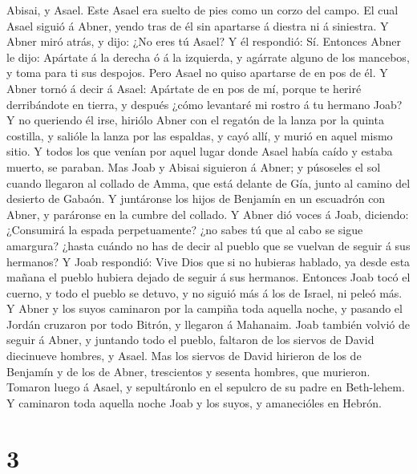 Abisai, y Asael. Este Asael era suelto de pies como un corzo del campo.
 El cual Asael siguió á Abner, yendo tras de él sin
apartarse á diestra ni á siniestra.  Y Abner miró atrás, y
dijo: ¿No eres tú Asael? Y él respondió: Sí.  Entonces
Abner le dijo: Apártate á la derecha ó á la izquierda, y agárrate alguno
de los mancebos, y toma para ti sus despojos. Pero Asael no quiso
apartarse de en pos de él.  Y Abner tornó á decir á Asael:
Apártate de en pos de mí, porque te heriré derribándote en tierra, y
después ¿cómo levantaré mi rostro á tu hermano Joab?  Y no
queriendo él irse, hiriólo Abner con el regatón de la lanza por la
quinta costilla, y salióle la lanza por las espaldas, y cayó allí, y
murió en aquel mismo sitio. Y todos los que venían por aquel lugar donde
Asael había caído y estaba muerto, se paraban.  Mas Joab y
Abisai siguieron á Abner; y púsoseles el sol cuando llegaron al collado
de Amma, que está delante de Gía, junto al camino del desierto de
Gabaón.  Y juntáronse los hijos de Benjamín en un escuadrón
con Abner, y paráronse en la cumbre del collado.  Y Abner
dió voces á Joab, diciendo: ¿Consumirá la espada perpetuamente? ¿no
sabes tú que al cabo se sigue amargura? ¿hasta cuándo no has de decir al
pueblo que se vuelvan de seguir á sus hermanos?  Y Joab
respondió: Vive Dios que si no hubieras hablado, ya desde esta mañana el
pueblo hubiera dejado de seguir á sus hermanos.  Entonces
Joab tocó el cuerno, y todo el pueblo se detuvo, y no siguió más á los
de Israel, ni peleó más.  Y Abner y los suyos caminaron por
la campiña toda aquella noche, y pasando el Jordán cruzaron por todo
Bitrón, y llegaron á Mahanaim.  Joab también volvió de
seguir á Abner, y juntando todo el pueblo, faltaron de los siervos de
David diecinueve hombres, y Asael.  Mas los siervos de
David hirieron de los de Benjamín y de los de Abner, trescientos y
sesenta hombres, que murieron. Tomaron luego á Asael, y sepultáronlo en
el sepulcro de su padre en Beth-lehem.  Y caminaron toda
aquella noche Joab y los suyos, y amanecióles en Hebrón.

\hypertarget{section-2}{%
\section{3}\label{section-2}}

